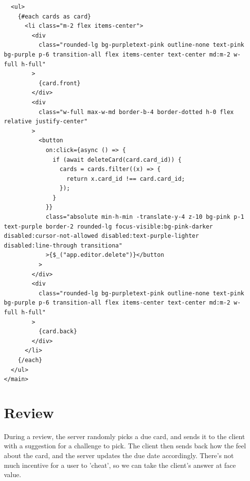 \documentclass{report}
\begin{document}
\begin{verbatim}
  <ul>
    {#each cards as card}
      <li class="m-2 flex items-center">
        <div
          class="rounded-lg bg-purpletext-pink outline-none text-pink bg-purple p-6 transition-all flex items-center text-center md:m-2 w-full h-full"
        >
          {card.front}
        </div>
        <div
          class="w-full max-w-md border-b-4 border-dotted h-0 flex relative justify-center"
        >
          <button
            on:click={async () => {
              if (await deleteCard(card.card_id)) {
                cards = cards.filter((x) => {
                  return x.card_id !== card.card_id;
                });
              }
            }}
            class="absolute min-h-min -translate-y-4 z-10 bg-pink p-1 text-purple border-2 rounded-lg focus-visible:bg-pink-darker disabled:cursor-not-allowed disabled:text-purple-lighter disabled:line-through transitiona"
            >{$_("app.editor.delete")}</button
          >
        </div>
        <div
          class="rounded-lg bg-purpletext-pink outline-none text-pink bg-purple p-6 transition-all flex items-center text-center md:m-2 w-full h-full"
        >
          {card.back}
        </div>
      </li>
    {/each}
  </ul>
</main>
\end{verbatim}

\section{Review}
\paragraph{}
During a review, the server randomly picks a due card, and sends it to the client with a suggestion for a challenge to pick. The client then sends back how the feel about the card, and the server updates the due date accordingly.
There's not much incentive for a user to 'cheat', so we can take the client's answer at face value.
\end{document}
